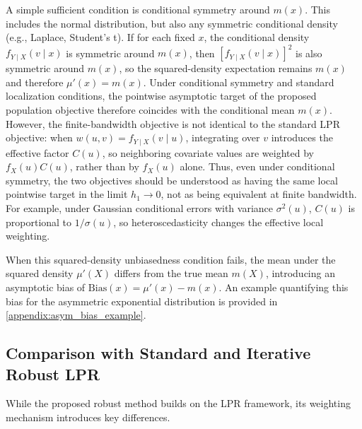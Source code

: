 \documentclass[preprint,1p,times,authoryear]{elsarticle}
\begin{document}
A simple sufficient condition is conditional symmetry around $m(x)$. This includes the normal distribution, but also any symmetric conditional density (e.g., Laplace, Student's t). If for each fixed $x$, the conditional density $f_{Y\mid X}(v\mid x)$ is symmetric around $m(x)$, then $[f_{Y\mid X}(v\mid x)]^2$ is also symmetric around $m(x)$, so the squared-density expectation remains $m(x)$ and therefore $\mu'(x)=m(x)$. Under conditional symmetry and standard localization conditions, the pointwise asymptotic target of the proposed population objective therefore coincides with the conditional mean \(m(x)\). However, the finite-bandwidth objective is not identical to the standard LPR objective: when \(w(u,v)=f_{Y\mid X}(v\mid u)\), integrating over \(v\) introduces the effective factor \(C(u)\), so neighboring covariate values are weighted by \(f_X(u)C(u)\), rather than by \(f_X(u)\) alone. Thus, even under conditional symmetry, the two objectives should be understood as having the same local pointwise target in the limit \(h_1\to0\), not as being equivalent at finite bandwidth. For example, under Gaussian conditional errors with variance \(\sigma^2(u)\), \(C(u)\) is proportional to \(1/\sigma(u)\), so heteroscedasticity changes the effective local weighting.

When this squared-density unbiasedness condition fails, the mean under the squared density $\mu'(X)$ differs from the true mean $m(X)$, introducing an asymptotic bias of $\text{Bias}(x) = \mu'(x) - m(x)$. An example quantifying this bias for the asymmetric exponential distribution is provided in \ref{appendix:asym_bias_example}.


\subsection{Comparison with Standard and Iterative Robust LPR}
While the proposed robust method builds on the LPR framework, its weighting mechanism introduces key differences.
\end{document}
